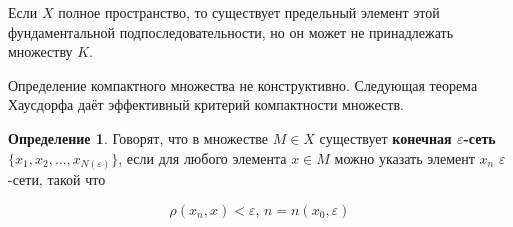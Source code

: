 \documentclass[12pt,a4paper,titlepage, oneside]{book}
\theoremstyle{definition}
\newtheorem*{definition}{Определение}
\theoremstyle{plain}
\theoremstyle{remark}
\theoremstyle{remark}
\theoremstyle{remark}
\theoremstyle{plain}
\theoremstyle{plain}
\begin{document}
Если $X$ полное пространство, то существует предельный элемент этой фундаментальной подпоследовательности, но он может не принадлежать множеству $K$.

Определение компактного множества не конструктивно. Следующая теорема Хаусдорфа даёт эффективный критерий компактности множеств.

\begin{definition}
Говорят, что в множестве $M \in X$ существует \textbf{конечная $\varepsilon$-сеть $\lbrace x_1,x_2,\ldots,x_{N(\varepsilon)} \rbrace$}, если для любого элемента $x \in M$ можно указать элемент $x_n$ $\varepsilon$-сети, такой что

\begin{equation*}
\rho(x_n, x) < \varepsilon \mbox{, } n=n(x_0,\varepsilon)
\end{equation*}

\end{definition}
\end{document}
